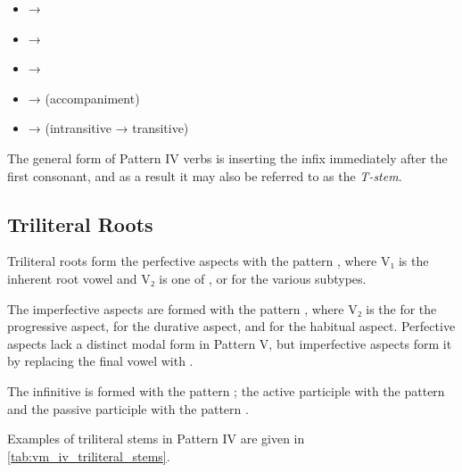\documentclass[grammar]{subfiles}
\begin{document}
\begin{itemize}
  \item {} → 
  \item {} → 
  \item {} → 
  \item {} →  (accompaniment)
  \item {} →  (intransitive → transitive)
\end{itemize}

The general form of Pattern IV verbs is inserting the infix  immediately
after the first consonant, and as a result it may also be referred to as the \emph{T-stem}. 


\subsection{Triliteral Roots}
\label{ssec:vm_iv_triliteral_roots}

Triliteral roots form the perfective aspects with the pattern
, where V₁ is the inherent root vowel and V₂ is one of ,
 or  for the various subtypes.  

The imperfective aspects are formed with the pattern , where
V₂ is the  for the progressive aspect,  for the durative aspect,
and  for the habitual aspect.  Perfective aspects lack a distinct modal
form in Pattern V, but imperfective aspects form it by replacing the final
vowel with . 

The infinitive is formed with the pattern ; the active
participle with the pattern  and the passive participle with the
pattern . 

Examples of triliteral stems in Pattern IV are given in
\cref{tab:vm_iv_triliteral_stems}. 
\end{document}
